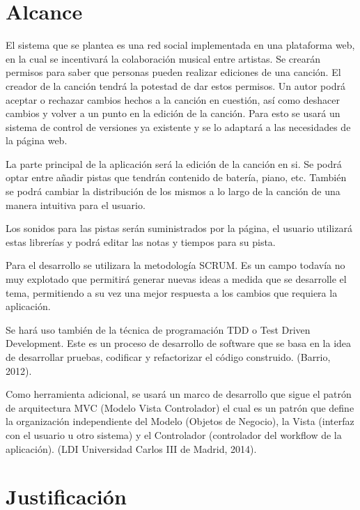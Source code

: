 \section{Alcance}

El sistema que se plantea es una red social implementada en una plataforma web,
en la cual se incentivará la colaboración musical entre artistas. Se crearán
permisos para saber que personas pueden realizar ediciones de una canción. El
creador de la canción tendrá la potestad de dar estos permisos.  Un autor podrá
aceptar o rechazar cambios hechos a la canción en cuestión, así como deshacer
cambios y volver a un punto en la edición de la canción. Para esto se usará un
sistema de control de versiones ya existente y se lo adaptará a las necesidades
de la página web.

La parte principal de la aplicación será la edición de la canción en si. Se
podrá optar entre añadir pistas que tendrán contenido de batería, piano, etc.
También se podrá cambiar la distribución de los mismos a lo largo de la canción
de una manera intuitiva para el usuario.

Los sonidos para las pistas serán suministrados por la página, el usuario
utilizará estas librerías y podrá editar las notas y tiempos para su pista.

Para el desarrollo se utilizara la metodología SCRUM. Es un campo todavía no
muy explotado que permitirá generar nuevas ideas a medida que  se desarrolle el
tema, permitiendo a su vez una mejor respuesta a los cambios que requiera la
aplicación.

Se hará uso también de la técnica de programación TDD o Test Driven
Development. Este es un proceso de desarrollo de software que se basa en la
idea de desarrollar pruebas, codificar y refactorizar el código construido.
(Barrio, 2012).

Como herramienta adicional, se usará un marco de desarrollo que sigue el patrón
de arquitectura MVC (Modelo Vista Controlador) el cual es un patrón que define
la organización independiente del Modelo (Objetos de Negocio), la Vista
(interfaz con el usuario u otro sistema) y el Controlador (controlador del
workflow de la aplicación).  (LDI Universidad Carlos III de Madrid, 2014).

\section{Justificación}


